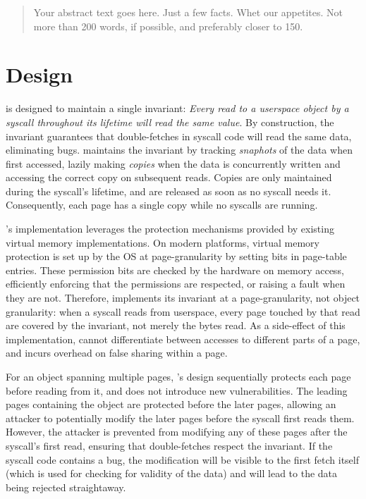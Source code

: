 \documentclass[letterpaper,twocolumn,10pt, anonymous]{article}
\begin{document}
\begin{abstract}
Your abstract text goes here. Just a few facts. Whet our appetites.
Not more than 200 words, if possible, and preferably closer to 150.
\end{abstract}

\section{Design}

\tiktok is designed to maintain a single invariant: 
\emph{Every read to a userspace object by a syscall throughout its lifetime 
will read the same value}.
By construction, the invariant guarantees that double-fetches in syscall
code will read the same data, eliminating \tocttou bugs. 
\tiktok maintains the invariant by tracking \emph{snaphots} of the data
when first accessed, lazily making \emph{copies} when the data is concurrently 
written and accessing the correct copy on subsequent reads.
Copies are only maintained during the syscall's lifetime, and are released as 
soon as no syscall needs it.
Consequently, each page has a single copy while no syscalls are running.

\tiktok's implementation leverages the protection mechanisms provided by 
existing virtual memory implementations. 
On modern platforms, virtual memory protection is set up by the OS at
page-granularity by setting bits in page-table entries.
These permission bits are checked by the hardware on memory access, 
efficiently enforcing that the permissions are respected, or raising 
a fault when they are not.
Therefore, \tiktok implements its invariant at a page-granularity, not object 
granularity: when a syscall reads from userspace, every page touched by that 
read are covered by the invariant, not merely the bytes read.
As a side-effect of this implementation, \tiktok cannot differentiate between
accesses to different parts of a page, and incurs overhead on false sharing
within a page.

For an object spanning multiple pages, \tiktok's design sequentially 
protects each page before reading from it, and does not introduce 
new vulnerabilities. 
The leading pages containing the object are protected before the
later pages, allowing an attacker to potentially modify the later 
pages before the syscall first reads them.
However, the attacker is prevented from modifying any of these pages
after the syscall's first read, ensuring that double-fetches respect
the invariant.
If the syscall code contains a \tocttou bug, the modification will
be visible to the first fetch itself (which is used for checking for 
validity of the data) and will lead to the data being rejected 
straightaway.
\end{document}
